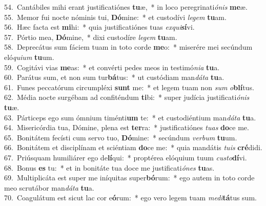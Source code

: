 {54.~}Cantábiles mihi erant justificatiónes \textbf{tu}æ,~* in loco peregrinati\textit{ó}\textit{nis} \textbf{me}æ.\\
{55.~}Memor fui nocte nóminis tui, \textbf{Dó}mine:~* et custodívi \textit{le}\textit{gem} \textbf{tu}am.\\
{56.~}Hæc facta est \textbf{mi}hi:~* quia justificatiónes tuas \textit{ex}\textit{qui}\textbf{sí}vi.\\
{57.~}Pórtio mea, \textbf{Dó}mine,~* dixi custodíre \textit{le}\textit{gem} \textbf{tu}am.\\
{58.~}Deprecátus sum fáciem tuam in toto corde \textbf{me}o:~* miserére mei secúndum eló\textit{qui}\textit{um} \textbf{tu}um.\\
{59.~}Cogitávi vias \textbf{me}as:~* et convérti pedes meos in testimó\textit{ni}\textit{a} \textbf{tu}a.\\
{60.~}Parátus sum, et non sum tur\textbf{bá}tus:~* ut custódiam man\textit{dá}\textit{ta} \textbf{tu}a.\\
{61.~}Funes peccatórum circumpléxi \textbf{sunt} me:~* et legem tuam non \textit{sum} \textit{o}\textbf{blí}tus.\\
{62.~}Média nocte surgébam ad confiténdum \textbf{ti}bi:~* super judícia justificati\textit{ó}\textit{nis} \textbf{tu}æ.\\
{63.~}Párticeps ego sum ómnium timénti\textbf{um} te:~* et custodiéntium man\textit{dá}\textit{ta} \textbf{tu}a.\\
{64.~}Misericórdia tua, Dómine, plena est \textbf{ter}ra:~* justificatiónes \textit{tu}\textit{as} \textbf{do}ce me.\\
{65.~}Bonitátem fecísti cum servo tuo, \textbf{Dó}mine:~* secúndum \textit{ver}\textit{bum} \textbf{tu}um.\\
{66.~}Bonitátem et disciplínam et sciéntiam \textbf{do}ce me:~* quia mandátis \textit{tu}\textit{is} \textbf{cré}didi.\\
{67.~}Priúsquam humiliárer ego de\textbf{lí}qui:~* proptérea elóquium tuum \textit{cu}\textit{sto}\textbf{dí}vi.\\
{68.~}Bonus \textbf{es} tu:~* et in bonitáte tua doce me justificati\textit{ó}\textit{nes} \textbf{tu}as.\\
{69.~}Multiplicáta est super me iníquitas super\textbf{bó}rum:~* ego autem in toto corde meo scrutábor man\textit{dá}\textit{ta} \textbf{tu}a.\\
{70.~}Coagulátum est sicut lac cor e\textbf{ó}rum:~* ego vero legem tuam \textit{me}\textit{di}\textbf{tá}tus sum.\\
